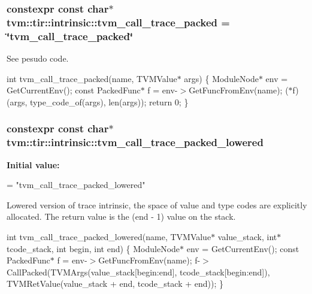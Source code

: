 \subsubsection[{\texorpdfstring{tvm\+\_\+call\+\_\+trace\+\_\+packed}{tvm_call_trace_packed}}]{\setlength{\rightskip}{0pt plus 5cm}constexpr const char$\ast$ tvm\+::tir\+::intrinsic\+::tvm\+\_\+call\+\_\+trace\+\_\+packed = \char`\"{}tvm\+\_\+call\+\_\+trace\+\_\+packed\char`\"{}}\hypertarget{namespacetvm_1_1tir_1_1intrinsic_a7127f9ff70e7e124403e6a22de1a82f3}{}\label{namespacetvm_1_1tir_1_1intrinsic_a7127f9ff70e7e124403e6a22de1a82f3}


See pesudo code. 

int tvm\+\_\+call\+\_\+trace\+\_\+packed(name, T\+V\+M\+Value$\ast$ args) \{ Module\+Node$\ast$ env = Get\+Current\+Env(); const Packed\+Func$\ast$ f = env-\/$>$Get\+Func\+From\+Env(name); ($\ast$f)(args, type\+\_\+code\+\_\+of(args), len(args)); return 0; \} 
\subsubsection[{\texorpdfstring{tvm\+\_\+call\+\_\+trace\+\_\+packed\+\_\+lowered}{tvm_call_trace_packed_lowered}}]{\setlength{\rightskip}{0pt plus 5cm}constexpr const char$\ast$ tvm\+::tir\+::intrinsic\+::tvm\+\_\+call\+\_\+trace\+\_\+packed\+\_\+lowered}\hypertarget{namespacetvm_1_1tir_1_1intrinsic_ad906c61d3e4610e103d5fee028e6147f}{}\label{namespacetvm_1_1tir_1_1intrinsic_ad906c61d3e4610e103d5fee028e6147f}
{\bfseries Initial value\+:}
\begin{DoxyCode}
=
    \textcolor{stringliteral}{"tvm\_call\_trace\_packed\_lowered"}
\end{DoxyCode}


Lowered version of trace intrinsic, the space of value and type codes are explicitly allocated. The return value is the (end -\/ 1) value on the stack. 

int tvm\+\_\+call\+\_\+trace\+\_\+packed\+\_\+lowered(name, T\+V\+M\+Value$\ast$ value\+\_\+stack, int$\ast$ tcode\+\_\+stack, int begin, int end) \{ Module\+Node$\ast$ env = Get\+Current\+Env(); const Packed\+Func$\ast$ f = env-\/$>$Get\+Func\+From\+Env(name); f-\/$>$Call\+Packed(T\+V\+M\+Args(value\+\_\+stack\mbox{[}begin\+:end\mbox{]}, tcode\+\_\+stack\mbox{[}begin\+:end\mbox{]}), T\+V\+M\+Ret\+Value(value\+\_\+stack + end, tcode\+\_\+stack + end)); \} 
